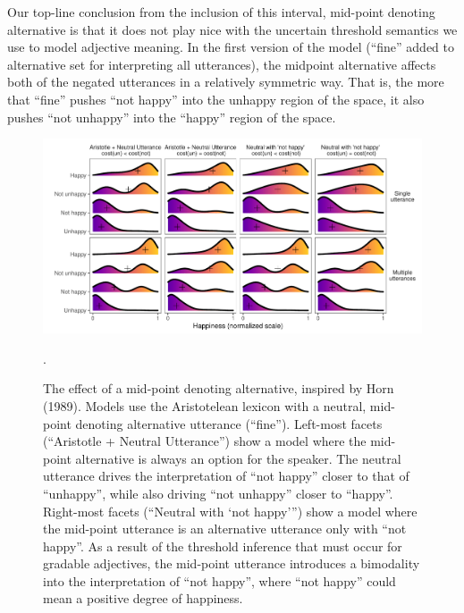 \documentclass[floatsintext,doc]{apa6}
\begin{document}
Our top-line conclusion from the inclusion of this interval, mid-point denoting alternative is that it does not play nice with the uncertain threshold semantics we use to model adjective meaning. 
In the first version of the model (``fine'' added to alternative set for interpreting all utterances), the midpoint alternative affects both of the negated utterances in a relatively symmetric way.
That is, the more that ``fine'' pushes ``not happy'' into the unhappy region of the space, it also pushes ``not unhappy'' into the ``happy'' region of the space. 

\begin{figure}[t]
\centering \includegraphics{figs/horn_SI.pdf} 
\caption{The effect of a mid-point denoting alternative, inspired by Horn (1989). Models use the Aristotelean lexicon with a neutral, mid-point denoting alternative utterance (``fine''). Left-most facets (``Aristotle + Neutral Utterance'') show a model where  the mid-point alternative is always an option for the speaker. The neutral utterance drives the interpretation of ``not happy'' closer to that of ``unhappy'', while also driving ``not unhappy'' closer to ``happy''. Right-most facets (``Neutral  with `not happy''') show a model where the mid-point utterance is an alternative utterance only with ``not happy''. As a result of the threshold inference that must occur for gradable adjectives, the mid-point utterance introduces a bimodality into the interpretation of ``not happy'', where ``not happy'' could mean a positive degree of happiness.}.\label{fig:horn}
\end{figure}
\end{document}
